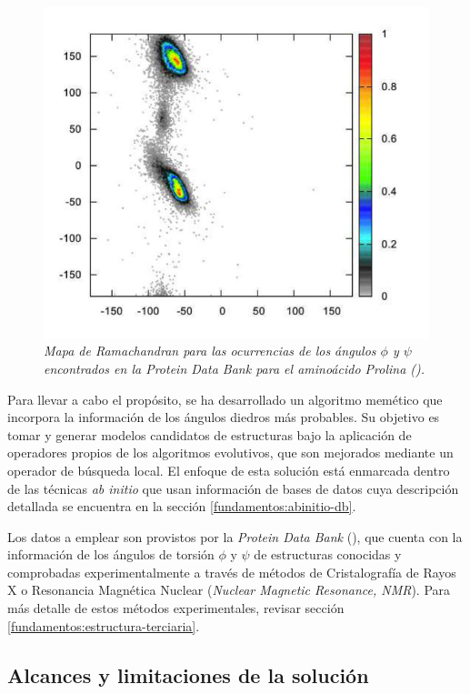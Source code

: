 \begin{figure}[tp]
	\centering
	\includegraphics[scale=.35]{images/rmc-proline.png}
	\caption{\em Mapa de Ramachandran para las ocurrencias de los ángulos $\phi$ y $\psi$ encontrados en la Protein Data Bank para el amino\'acido Prolina (\citealp{Dorn:2013}).}
	\label{fig:rmc-proline} 
\end{figure}

Para llevar a cabo el propósito, se ha desarrollado un algoritmo memético que incorpora la información de los ángulos diedros más probables. Su objetivo es tomar y generar modelos candidatos de estructuras bajo la aplicación de operadores propios de los algoritmos evolutivos, que son mejorados mediante un operador de búsqueda local. El enfoque de esta solución está enmarcada dentro de las técnicas \textit{ab initio} que usan información de bases de datos cuya descripción detallada se encuentra en la sección \ref{fundamentos:abinitio-db}.

Los datos a emplear son provistos por la \textit{Protein Data Bank} (\citealp{Berman:2000}), que cuenta con la información de los ángulos de torsión $\phi$ y $\psi$ de estructuras conocidas y comprobadas experimentalmente a través de métodos de Cristalografía de Rayos X o Resonancia Magnética Nuclear (\textit{Nuclear Magnetic Resonance, NMR}). Para más detalle de estos métodos experimentales, revisar sección \ref{fundamentos:estructura-terciaria}.

\subsection{Alcances y limitaciones de la solución}

